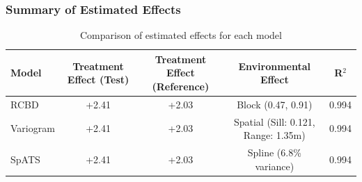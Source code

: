 \documentclass[aspectratio=43]{beamer}
\begin{document}
\begin{frame}
    \frametitle{Summary of Estimated Effects}
    \begin{table}[h]
        \centering
        \scriptsize
        \begin{tabular}{|l|c|c|c|c|}
            \hline
            \rowcolor{lightblue}
            \textbf{Model} & \textbf{Treatment Effect (Test)} & \textbf{Treatment Effect (Reference)} & \textbf{Environmental Effect} & \textbf{R$^2$} \\
            \hline
            \rowcolor{lightgray}
            RCBD & +2.41 & +2.03 & Block (0.47, 0.91) & 0.994 \\
            \hline
            Variogram & +2.41 & +2.03 & Spatial (Sill: 0.121, Range: 1.35m) & 0.994 \\
            \hline
            \rowcolor{lightgray}
            SpATS & +2.41 & +2.03 & Spline (6.8\% variance) & 0.994 \\
            \hline
        \end{tabular}
        \caption{Comparison of estimated effects for each model}
    \end{table}
\end{frame}
\end{document}
